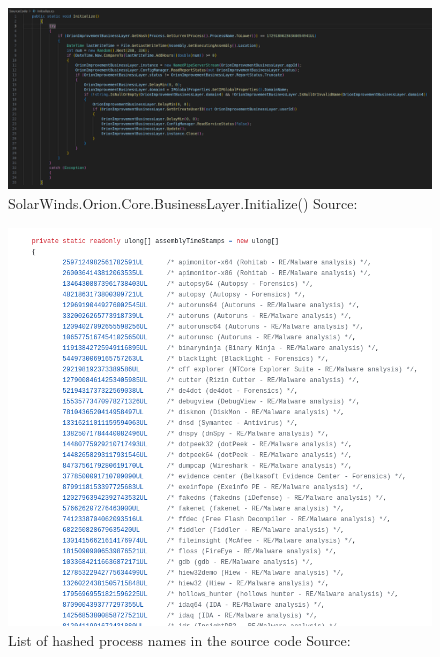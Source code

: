 \documentclass[
	letterpaper, %
	10pt, %
	unnumberedsections, %
	twoside, %
]{LTJournalArticle}
\begin{document}
\begin{appendices}
\begin{landscape}
	\begin{figure}[p] %
		\includegraphics[width=\linewidth]{Figures/Initialize.png}
		\caption{SolarWinds.Orion.Core.BusinessLayer.Initialize() Source:\cite{SolarWindsOrionCoreBusinessLayerdll}}
		\label{fig:Initialize}
	\end{figure}

\end{landscape}

\begin{figure}[p] %
	\includegraphics[width=\linewidth]{Figures/hashedProcessNames.png}
	\caption{List of hashed process names in the source code Source:\cite{SolarWindsOrionCoreBusinessLayerdll}}
	\label{fig:HashedProcesses}
\end{figure}

\end{appendices}
\end{document}
